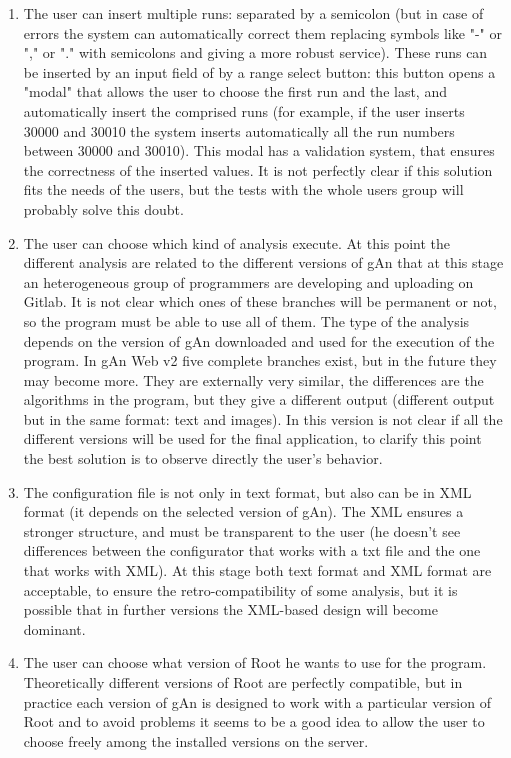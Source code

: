 \begin{enumerate}

\item The user can insert multiple runs: separated by a semicolon (but in case of errors the system can automatically correct them replacing symbols like "-" or "," or "." with semicolons and giving a more robust service). These runs can be inserted by an input field of by a range select button: this button opens a "modal" that allows the user to choose the first run and the last, and automatically insert the comprised runs (for example, if the user inserts 30000 and 30010 the system inserts automatically all the run numbers between 30000 and 30010). This modal has a validation system, that ensures the correctness of the inserted values. It is not perfectly clear if this solution fits the needs of the users, but the tests with the whole users group will probably solve this doubt. 

\item The user can choose which kind of analysis execute. At this point the different analysis are related to the different versions of gAn that at this stage an heterogeneous group of programmers are developing and uploading on Gitlab. It is not clear which ones of these branches will be permanent or not, so the program must be able to use all of them. The type of the analysis depends on the version of gAn downloaded and used for the execution of the program. In gAn Web v2 five complete branches exist, but in the future they may become more. They are externally very similar, the differences are the algorithms in the program, but they give a different output (different output but in the same format: text and images). 
In this version is not clear if all the different versions will be used for the final application, to clarify this point the best solution is to observe directly the user's behavior. 

\item The configuration file is not only in text format, but also can be in XML format (it depends on the selected version of gAn). The XML ensures a stronger structure, and must be transparent to the user (he doesn't see differences between the configurator that works with a txt file and the one that works with XML). At this stage both text format and XML format are acceptable, to ensure the retro-compatibility of some analysis, but it is possible that in further versions the XML-based design will become dominant. 

\item The user can choose what version of Root he wants to use for the program. Theoretically different versions of Root are perfectly compatible, but in practice each version of gAn is designed to work with a particular version of Root and to avoid problems it seems to be a good idea to allow the user to choose freely among the installed versions on the server.  


\end{enumerate}
